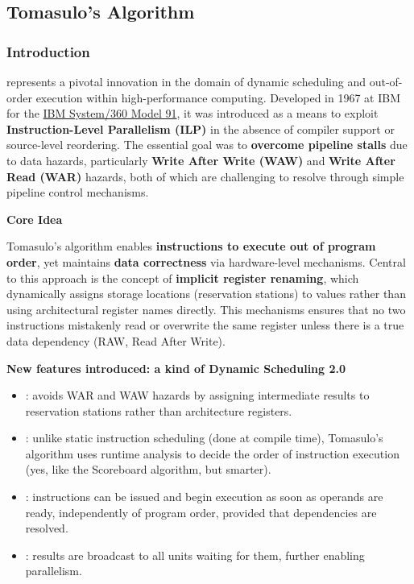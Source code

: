 \subsection{Tomasulo's Algorithm}

\subsubsection{Introduction}

 represents a pivotal innovation in the domain of dynamic scheduling and out-of-order execution within high-performance computing. Developed in 1967 at IBM for the \href{https://en.wikipedia.org/wiki/IBM_System/360_Model_91}{IBM System/360 Model 91}, it was introduced as a means to exploit \textbf{Instruction-Level Parallelism (ILP)} in the absence of compiler support or source-level reordering. The essential goal was to \textbf{overcome pipeline stalls} due to data hazards, particularly \textbf{Write After Write (WAW)} and \textbf{Write After Read (WAR)} hazards, both of which are challenging to resolve through simple pipeline control mechanisms.

\highspace
\begin{flushleft}
    \textcolor{Green3}{ \textbf{Core Idea}}
\end{flushleft}
Tomasulo's algorithm enables \textbf{instructions to execute out of program order}, yet maintains \textbf{data correctness} via hardware-level mechanisms. Central to this approach is the concept of \textbf{implicit register renaming}, which dynamically assigns storage locations (reservation stations) to values rather than using architectural register names directly. This mechanisms ensures that no two instructions mistakenly read or overwrite the same register unless there is a true data dependency (RAW, Read After Write).

\highspace
\begin{flushleft}
    \textcolor{Green3}{ \textbf{New features introduced: a kind of Dynamic Scheduling 2.0}}
\end{flushleft}
\begin{itemize}
    \item {}: avoids WAR and WAW hazards by assigning intermediate results to reservation stations rather than architecture registers.
    \item {}: unlike static instruction scheduling (done at compile time), Tomasulo's algorithm uses runtime analysis to decide the order of instruction execution (yes, like the Scoreboard algorithm, but smarter).
    \item {}: instructions can be issued and begin execution as soon as operands are ready, independently of program order, provided that dependencies are resolved.
    \item {}: results are broadcast to all units waiting for them, further enabling parallelism.
\end{itemize}

